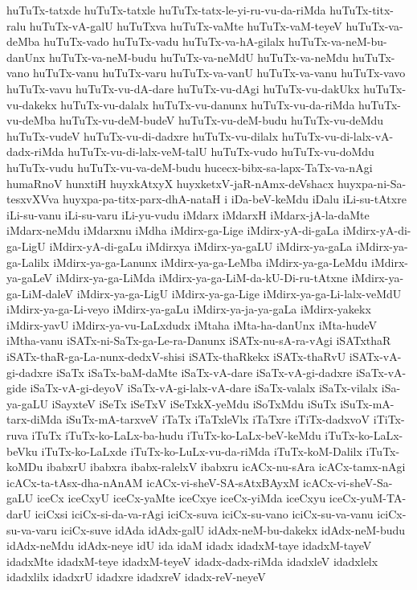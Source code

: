 {huTuTx-tatxde
huTuTx-tatxle
huTuTx-tatx-le-yi-ru-vu-da-riMda
huTuTx-titx-ralu
huTuTx-vA-galU
huTuTxva
huTuTx-vaMte
huTuTx-vaM-teyeV
huTuTx-va-deMba
huTuTx-vado
huTuTx-vadu
huTuTx-va-hA-gilalx
huTuTx-va-neM-bu-danUnx
huTuTx-va-neM-budu
huTuTx-va-neMdU
huTuTx-va-neMdu
huTuTx-vano
huTuTx-vanu
huTuTx-varu
huTuTx-va-vanU
huTuTx-va-vanu
huTuTx-vavo
huTuTx-vavu
huTuTx-vu-dA-dare
huTuTx-vu-dAgi
huTuTx-vu-dakUkx
huTuTx-vu-dakekx
huTuTx-vu-dalalx
huTuTx-vu-danunx
huTuTx-vu-da-riMda
huTuTx-vu-deMba
huTuTx-vu-deM-budeV
huTuTx-vu-deM-budu
huTuTx-vu-deMdu
huTuTx-vudeV
huTuTx-vu-di-dadxre
huTuTx-vu-dilalx
huTuTx-vu-di-lalx-vA-dadx-riMda
huTuTx-vu-di-lalx-veM-talU
huTuTx-vudo
huTuTx-vu-doMdu
huTuTx-vudu
huTuTx-vu-va-deM-budu
hucecx-bibx-sa-lapx-TaTx-va-nAgi
humaRnoV
hunxtiH
huyxkAtxyX
huyxketxV-jaR-nAmx-deVshacx
huyxpa-ni-Sa-tesxvXVva
huyxpa-pa-titx-parx-dhA-nataH
i
iDa-beV-keMdu
iDalu
iLi-su-tAtxre
iLi-su-vanu
iLi-su-varu
iLi-yu-vudu
iMdarx
iMdarxH
iMdarx-jA-la-daMte
iMdarx-neMdu
iMdarxnu
iMdha
iMdirx-ga-Lige
iMdirx-yA-di-gaLa
iMdirx-yA-di-ga-LigU
iMdirx-yA-di-gaLu
iMdirxya
iMdirx-ya-gaLU
iMdirx-ya-gaLa
iMdirx-ya-ga-Lalilx
iMdirx-ya-ga-Lanunx
iMdirx-ya-ga-LeMba
iMdirx-ya-ga-LeMdu
iMdirx-ya-gaLeV
iMdirx-ya-ga-LiMda
iMdirx-ya-ga-LiM-da-kU-Di-ru-tAtxne
iMdirx-ya-ga-LiM-daleV
iMdirx-ya-ga-LigU
iMdirx-ya-ga-Lige
iMdirx-ya-ga-Li-lalx-veMdU
iMdirx-ya-ga-Li-veyo
iMdirx-ya-gaLu
iMdirx-ya-ja-ya-gaLa
iMdirx-yakekx
iMdirx-yavU
iMdirx-ya-vu-LaLxdudx
iMtaha
iMta-ha-danUnx
iMta-hudeV
iMtha-vanu
iSATx-ni-SaTx-ga-Le-ra-Danunx
iSATx-nu-sA-ra-vAgi
iSATxthaR
iSATx-thaR-ga-La-nunx-dedxV-shisi
iSATx-thaRkekx
iSATx-thaRvU
iSATx-vA-gi-dadxre
iSaTx
iSaTx-baM-daMte
iSaTx-vA-dare
iSaTx-vA-gi-dadxre
iSaTx-vA-gide
iSaTx-vA-gi-deyoV
iSaTx-vA-gi-lalx-vA-dare
iSaTx-valalx
iSaTx-vilalx
iSa-ya-gaLU
iSayxteV
iSeTx
iSeTxV
iSeTxkX-yeMdu
iSoTxMdu
iSuTx
iSuTx-mA-tarx-diMda
iSuTx-mA-tarxveV
iTaTx
iTaTxleVlx
iTaTxre
iTiTx-dadxvoV
iTiTx-ruva
iTuTx
iTuTx-ko-LaLx-ba-hudu
iTuTx-ko-LaLx-beV-keMdu
iTuTx-ko-LaLx-beVku
iTuTx-ko-LaLxde
iTuTx-ko-LuLx-vu-da-riMda
iTuTx-koM-Dalilx
iTuTx-koMDu
ibabxrU
ibabxra
ibabx-ralelxV
ibabxru
icACx-nu-sAra
icACx-tamx-nAgi
icACx-ta-tAsx-dha-nAnAM
icACx-vi-sheV-SA-sAtxBAyxM
icACx-vi-sheV-Sa-gaLU
iceCx
iceCxyU
iceCx-yaMte
iceCxye
iceCx-yiMda
iceCxyu
iceCx-yuM-TA-darU
iciCxsi
iciCx-si-da-va-rAgi
iciCx-suva
iciCx-su-vano
iciCx-su-va-vanu
iciCx-su-va-varu
iciCx-suve
idAda
idAdx-galU
idAdx-neM-bu-dakekx
idAdx-neM-budu
idAdx-neMdu
idAdx-neye
idU
ida
idaM
idadx
idadxM-taye
idadxM-tayeV
idadxMte
idadxM-teye
idadxM-teyeV
idadx-dadx-riMda
idadxleV
idadxlelx
idadxlilx
idadxrU
idadxre
idadxreV
idadx-reV-neyeV
}
